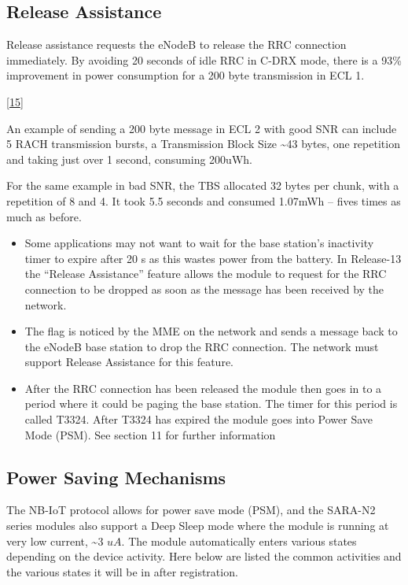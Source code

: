 \documentclass[]{article}
\providecommand{\tightlist}{%
  \setlength{\itemsep}{0pt}\setlength{\parskip}{0pt}}
\begin{document}
\hypertarget{release_a}{%
\subsection{Release Assistance}\label{release_a}}

Release assistance requests the eNodeB to release the RRC connection
immediately. By avoiding 20 seconds of idle RRC in C-DRX mode, there is
a 93\% improvement in power consumption for a 200 byte transmission in
ECL 1.

{[}\protect\hyperlink{ref-ubloxAppNote2018}{15}{]}

An example of sending a 200 byte message in ECL 2 with good SNR can
include 5 RACH transmission bursts, a Transmission Block Size
\textasciitilde{}43 bytes, one repetition and taking just over 1 second,
consuming 200uWh.

For the same example in bad SNR, the TBS allocated 32 bytes per chunk,
with a repetition of 8 and 4. It took 5.5 seconds and consumed 1.07mWh
-- fives times as much as before.

\begin{itemize}
\tightlist
\item
  Some applications may not want to wait for the base station's
  inactivity timer to expire after 20 s as this wastes power from the
  battery. In Release-13 the ``Release Assistance'' feature allows the
  module to request for the RRC connection to be dropped as soon as the
  message has been received by the network.
\item
  The flag is noticed by the MME on the network and sends a message back
  to the eNodeB base station to drop the RRC connection. The network
  must support Release Assistance for this feature.
\item
  After the RRC connection has been released the module then goes in to
  a period where it could be paging the base station. The timer for this
  period is called T3324. After T3324 has expired the module goes into
  Power Save Mode (PSM). See section 11 for further information
\end{itemize}

\hypertarget{power-saving-mechanisms}{%
\subsection{Power Saving Mechanisms}\label{power-saving-mechanisms}}

The NB-IoT protocol allows for power save mode (PSM), and the SARA-N2
series modules also support a Deep Sleep mode where the module is
running at very low current, \textasciitilde{}3 \(uA\). The module
automatically enters various states depending on the device activity.
Here below are listed the common activities and the various states it
will be in after registration.
\end{document}
